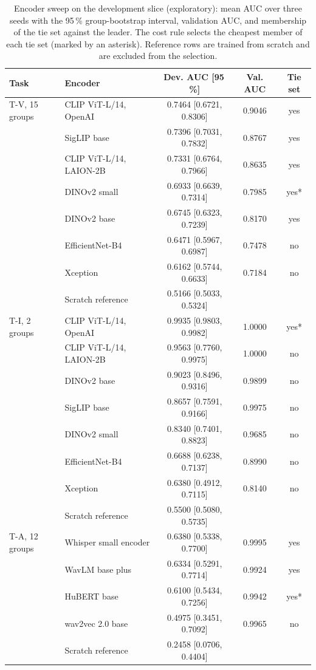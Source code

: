 \documentclass[conference,a4paper]{IEEEtran_nodash}
\begin{document}
\begin{table}[!t]
\centering
\caption[Encoder sweep on the development slice]{Encoder sweep on the development slice (exploratory): mean AUC over
three seeds with the 95\,\% group-bootstrap interval, validation AUC, and
membership of the tie set against the leader. The cost rule selects the cheapest
member of each tie set (marked by an asterisk). Reference rows are trained from
scratch and are excluded from the selection.}
\label{tab:sweep}
\small
\begin{tabular}{@{}l L{4.6cm} c c c@{}}
\toprule
Task & Encoder & Dev. AUC [95\,\%] & Val. AUC & Tie set \\
\midrule
T-V, 15 groups & CLIP ViT-L/14, OpenAI & 0.7464 [0.6721, 0.8306] & 0.9046 & yes \\
 & SigLIP base & 0.7396 [0.7031, 0.7832] & 0.8767 & yes \\
 & CLIP ViT-L/14, LAION-2B & 0.7331 [0.6764, 0.7966] & 0.8635 & yes \\
 & DINOv2 small & 0.6933 [0.6639, 0.7314] & 0.7985 & yes* \\
 & DINOv2 base & 0.6745 [0.6323, 0.7239] & 0.8170 & yes \\
 & EfficientNet-B4 & 0.6471 [0.5967, 0.6987] & 0.7478 & no \\
 & Xception & 0.6162 [0.5744, 0.6633] & 0.7184 & no \\
 & Scratch reference & 0.5166 [0.5033, 0.5324] & & \\
\midrule
T-I, 2 groups & CLIP ViT-L/14, OpenAI & 0.9935 [0.9803, 0.9982] & 1.0000 & yes* \\
 & CLIP ViT-L/14, LAION-2B & 0.9563 [0.7760, 0.9975] & 1.0000 & no \\
 & DINOv2 base & 0.9023 [0.8496, 0.9316] & 0.9899 & no \\
 & SigLIP base & 0.8657 [0.7591, 0.9166] & 0.9975 & no \\
 & DINOv2 small & 0.8340 [0.7401, 0.8823] & 0.9685 & no \\
 & EfficientNet-B4 & 0.6688 [0.6238, 0.7137] & 0.8990 & no \\
 & Xception & 0.6380 [0.4912, 0.7115] & 0.8140 & no \\
 & Scratch reference & 0.5500 [0.5080, 0.5735] & & \\
\midrule
T-A, 12 groups & Whisper small encoder & 0.6380 [0.5338, 0.7700] & 0.9995 & yes \\
 & WavLM base plus & 0.6334 [0.5291, 0.7714] & 0.9924 & yes \\
 & HuBERT base & 0.6100 [0.5434, 0.7256] & 0.9942 & yes* \\
 & wav2vec 2.0 base & 0.4975 [0.3451, 0.7092] & 0.9965 & no \\
 & Scratch reference & 0.2458 [0.0706, 0.4404] & & \\
\bottomrule
\end{tabular}
\end{table}
\end{document}
